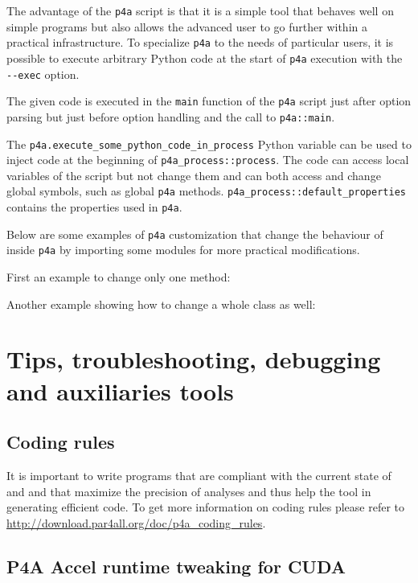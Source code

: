 \documentclass[a4paper]{article}
\begin{document}
The advantage of the \texttt{p4a} script is that it is a simple tool that
behaves well on simple programs but also allows the advanced user to go
further within a practical infrastructure.
To specialize \texttt{p4a} to the needs of particular users, it is
possible to execute
arbitrary Python code at the start of \texttt{p4a} execution with the
\verb|--exec| option.

The given code is executed in the \verb|main| function of the \verb|p4a|
script just after option parsing but just before option handling and the
call to \verb|p4a::main|.

The \verb|p4a.execute_some_python_code_in_process| Python variable can be
used to inject code at the beginning of \verb|p4a_process::process|.
The code can access local variables of the script but not change
them and can both access and change global symbols, such as global
\texttt{p4a} methods.
\verb|p4a_process::default_properties| contains the \Apips properties used
in \texttt{p4a}.

Below are some examples of \texttt{p4a} customization that change the
behaviour of \Apyps inside \texttt{p4a} by importing some modules for more
practical modifications.

First an example to change only one method:


Another example showing how to change a whole class as well:


\section{Tips, troubleshooting, debugging and auxiliaries tools}

\subsection{Coding rules}
It is important to write programs that are compliant with the
current state of \Apfa and \Apips and that maximize the precision of analyses and
thus help the tool in generating efficient code. To get more information on \Apfa 
coding rules please refer to \url{http://download.par4all.org/doc/p4a_coding_rules}.

\subsection{P4A Accel runtime tweaking for CUDA}
\label{sec:p4a-accel-runtime}
\end{document}
